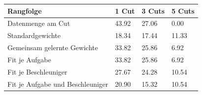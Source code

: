 \begin{tabular}{@{}llll@{}}
\toprule
Rangfolge & 1 Cut & 3 Cuts & 5 Cuts \\
\midrule
Datenmenge am Cut & 43.92 & 27.06 & 0.00 \\
Standardgewichte & 18.34 & 17.44 & 11.33 \\
Gemeinsam gelernte Gewichte & 33.82 & 25.86 & 6.92 \\
Fit je Aufgabe & 33.82 & 25.86 & 6.92 \\
Fit je Beschleuniger & 27.67 & 24.28 & 10.54 \\
Fit je Aufgabe und Beschleuniger & 20.90 & 15.32 & 10.54 \\
\bottomrule
\end{tabular}
